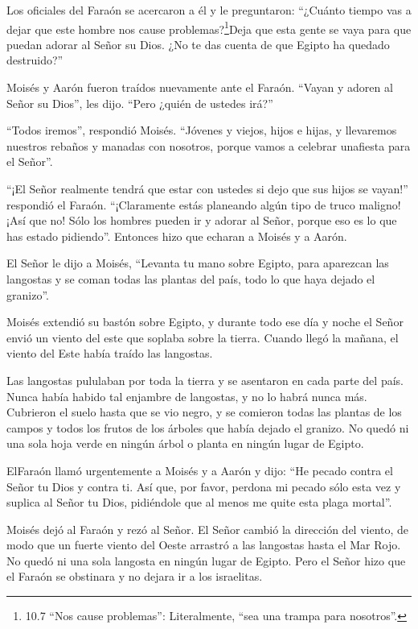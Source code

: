  Los oficiales del Faraón se acercaron a él y le
preguntaron: ``¿Cuánto tiempo vas a dejar que este hombre nos cause
problemas?\footnote{10.7 ``Nos cause problemas'': Literalmente, ``sea
  una trampa para nosotros''.}Deja que esta gente se vaya para que
puedan adorar al Señor su Dios. ¿No te das cuenta de que Egipto ha
quedado destruido?''

 Moisés y Aarón fueron traídos nuevamente ante el Faraón.
``Vayan y adoren al Señor su Dios'', les dijo. ``Pero ¿quién de ustedes
irá?''

 ``Todos iremos'', respondió Moisés. ``Jóvenes y viejos,
hijos e hijas, y llevaremos nuestros rebaños y manadas con nosotros,
porque vamos a celebrar unafiesta para el Señor''.

 ``¡El Señor realmente tendrá que estar con ustedes si dejo
que sus hijos se vayan!'' respondió el Faraón. ``¡Claramente estás
planeando algún tipo de truco maligno!  ¡Así que no! Sólo
los hombres pueden ir y adorar al Señor, porque eso es lo que has estado
pidiendo''. Entonces hizo que echaran a Moisés y a Aarón.

 El Señor le dijo a Moisés, ``Levanta tu mano sobre Egipto,
para aparezcan las langostas y se coman todas las plantas del país, todo
lo que haya dejado el granizo''.

 Moisés extendió su bastón sobre Egipto, y durante todo ese
día y noche el Señor envió un viento del este que soplaba sobre la
tierra. Cuando llegó la mañana, el viento del Este había traído las
langostas.

 Las langostas pululaban por toda la tierra y se asentaron
en cada parte del país. Nunca había habido tal enjambre de langostas, y
no lo habrá nunca más.  Cubrieron el suelo hasta que se vio
negro, y se comieron todas las plantas de los campos y todos los frutos
de los árboles que había dejado el granizo. No quedó ni una sola hoja
verde en ningún árbol o planta en ningún lugar de Egipto.

 ElFaraón llamó urgentemente a Moisés y a Aarón y dijo:
``He pecado contra el Señor tu Dios y contra ti.  Así que,
por favor, perdona mi pecado sólo esta vez y suplica al Señor tu Dios,
pidiéndole que al menos me quite esta plaga mortal''.

 Moisés dejó al Faraón y rezó al Señor.  El
Señor cambió la dirección del viento, de modo que un fuerte viento del
Oeste arrastró a las langostas hasta el Mar Rojo. No quedó ni una sola
langosta en ningún lugar de Egipto.  Pero el Señor hizo que
el Faraón se obstinara y no dejara ir a los israelitas.

